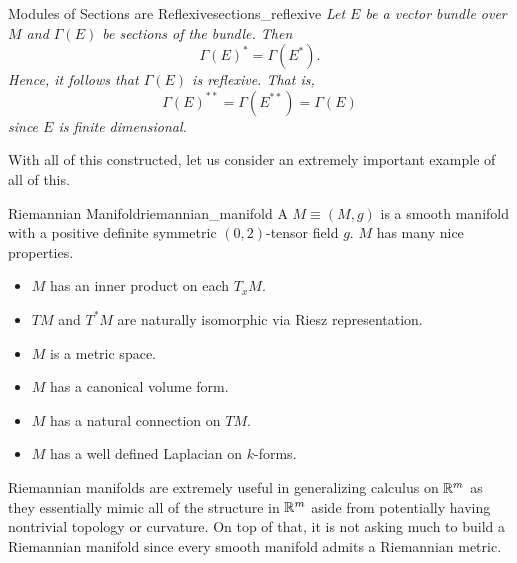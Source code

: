 \begin{thm}{Modules of Sections are Reflexive}{sections_reflexive}
\emph{Let $E$ be a vector bundle over $M$ and $\Gamma(E)$ be sections of the bundle. Then}
\[
\Gamma(E)^* = \Gamma(E^*).
\]
\emph{Hence, it follows that $\Gamma(E)$ is reflexive. That is,}
\[
\Gamma(E)^{**}=\Gamma(E^{**})=\Gamma(E)
\]
\emph{since $E$ is finite dimensional.}
\end{thm}

With all of this constructed, let us consider an extremely important example of all of this.  

\begin{ex}{Riemannian Manifold}{riemannian_manifold}
A  $M\equiv(M,g)$ is a smooth manifold with a positive definite symmetric $(0,2)$-tensor field $g$. $M$ has many nice properties.
\begin{itemize}
    \item $M$ has an inner product on each $T_xM$.
    \item $TM$ and $T^*M$ are naturally isomorphic via Riesz representation.
    \item $M$ is a metric space.
    \item $M$ has a canonical volume form.
    \item $M$ has a natural connection on $TM$.
    \item $M$ has a well defined Laplacian on $k$-forms.
\end{itemize}
\end{ex}

Riemannian manifolds are extremely useful in generalizing calculus on $\mathbb{R}^m$ as they essentially mimic all of the structure in $\mathbb{R}^m$ aside from potentially having nontrivial topology or curvature.  On top of that, it is not asking much to build a Riemannian manifold since every smooth manifold admits a Riemannian metric.